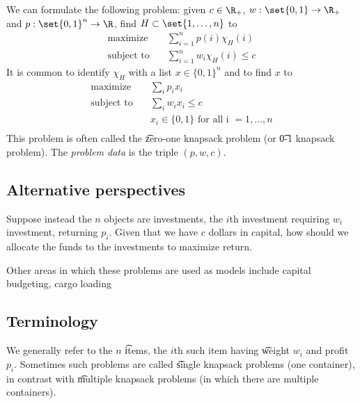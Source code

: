 We can formulate the following problem: given $c \in \R _+$, $w: \set{0,1} \to \R _+$ and $p: \set{0,1}^n \to \R $, find $H \subset \set{1, \dots , n}$ to
\[
\textstyle
\begin{aligned}
\text{maximize} & \quad \textstyle \sum_{i = 1}^{n} p(i) \chi _{H}(i) \\
\text{subject to} & \quad \textstyle \sum_{i = 1}^{n} w_i \chi _{H}(i) \leq c
\end{aligned}
\]
It is common to identify $\chi _H$ with a list $x \in \{0,1\}^n$ and to find $x$ to
\[
\textstyle
\begin{aligned}
\text{maximize} & \quad \textstyle \sum_i p_i x_i \\
\text{subject to} & \quad \textstyle \sum_i w_i x_i \leq c \\
& \quad x_i \in \{0,1\} \text{ for all i } = 1, \dots , n \\
\end{aligned}
\]
This problem is often called the \t{zero-one knapsack problem} (or \t{0-1 knapsack problem}).
The \textit{problem data} is the triple $(p, w, c)$.

\subsection*{Alternative perspectives}

Suppose instead the $n$ objects are investments, the $i$th investment requiring $w_i$ investment, returning $p_i$.
Given that we have $c$ dollars in capital, how should we allocate the funds to the investments to maximize return.

Other areas in which these problems are used as models include capital budgeting, cargo loading
\blankpage

\subsection*{Terminology}

We generally refer to the $n$ \t{items}, the $i$th such item having \t{weight} $w_i$ and profit $p_i$.
Sometimes such problems are called \t{single knapsack problems} (one container), in contrast with \t{multiple knapsack problems} (in which there are multiple containers).
